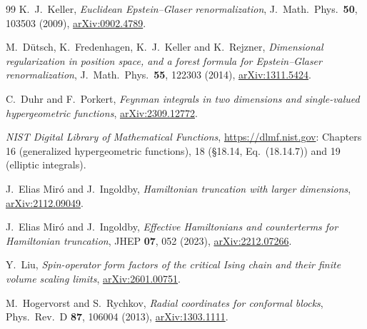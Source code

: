 \begin{thebibliography}{99}
K.~J.~Keller,
\emph{Euclidean Epstein--Glaser renormalization},
J.\ Math.\ Phys.\ \textbf{50}, 103503 (2009),
\href{https://arxiv.org/abs/0902.4789}{arXiv:0902.4789}.

M.~D\"utsch, K.~Fredenhagen, K.~J.~Keller and K.~Rejzner,
\emph{Dimensional regularization in position space, and a forest formula for Epstein--Glaser renormalization},
J.\ Math.\ Phys.\ \textbf{55}, 122303 (2014),
\href{https://arxiv.org/abs/1311.5424}{arXiv:1311.5424}.

C.~Duhr and F.~Porkert,
\emph{Feynman integrals in two dimensions and single-valued hypergeometric functions},
\href{https://arxiv.org/abs/2309.12772}{arXiv:2309.12772}.

\emph{NIST Digital Library of Mathematical Functions}, \url{https://dlmf.nist.gov}: Chapters 16 (generalized hypergeometric functions), 18 (\S18.14, Eq.~(18.14.7)) and 19 (elliptic integrals).

J.~Elias Mir\'o and J.~Ingoldby,
\emph{Hamiltonian truncation with larger dimensions},
\href{https://arxiv.org/abs/2112.09049}{arXiv:2112.09049}.

J.~Elias Mir\'o and J.~Ingoldby,
\emph{Effective Hamiltonians and counterterms for Hamiltonian truncation},
JHEP \textbf{07}, 052 (2023),
\href{https://arxiv.org/abs/2212.07266}{arXiv:2212.07266}.

Y.~Liu,
\emph{Spin-operator form factors of the critical Ising chain and their finite volume scaling limits},
\href{https://arxiv.org/abs/2601.00751}{arXiv:2601.00751}.

M.~Hogervorst and S.~Rychkov,
\emph{Radial coordinates for conformal blocks},
Phys.\ Rev.\ D \textbf{87}, 106004 (2013),
\href{https://arxiv.org/abs/1303.1111}{arXiv:1303.1111}.
\end{thebibliography}
